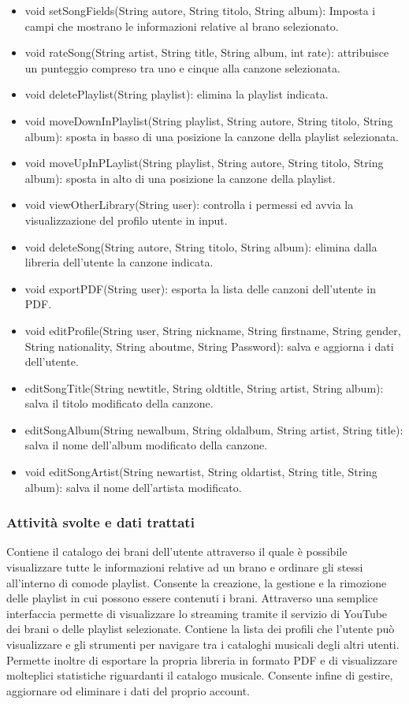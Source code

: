 \begin{itemize}
    \item void setSongFields(String autore, String titolo, String album):
    Imposta i campi che mostrano le informazioni relative al brano selezionato.
    \item void rateSong(String artist, String title, String album, int rate):
    attribuisce un punteggio compreso tra uno e cinque alla canzone selezionata.
    \item void deletePlaylist(String playlist): elimina la playlist
    indicata.
    \item void moveDownInPlaylist(String playlist, String autore, String
    titolo, String album): sposta in basso di una posizione la canzone della
    playlist selezionata.
    \item void moveUpInPLaylist(String playlist, String autore, String titolo,
    String album): sposta in alto di una posizione la canzone della playlist.
    \item
    void viewOtherLibrary(String user): controlla i permessi ed avvia la
    visualizzazione del profilo utente in input.
    \item void deleteSong(String autore, String titolo, String album): elimina
    dalla libreria dell'utente la canzone indicata.
    \item void exportPDF(String user): esporta la lista delle canzoni
    dell'utente in PDF.
    \item void editProfile(String user, String nickname, String firstname,
    String gender, String nationality, String aboutme, String Password):
    salva e aggiorna i dati dell'utente.
    \item editSongTitle(String newtitle, String oldtitle, String artist, String
    album): salva il titolo modificato della canzone.
    \item editSongAlbum(String newalbum, String oldalbum, String artist, String
    title): salva il nome dell'album modificato della canzone.
    \item void editSongArtist(String newartist, String oldartist, String title,
    String album): salva il nome dell'artista modificato.
\end{itemize}
 \subsubsection*{Attivit\`a svolte e dati trattati}
Contiene il catalogo dei brani dell'utente attraverso il quale \`e possibile
visualizzare tutte le informazioni relative ad un brano e ordinare gli stessi
all'interno di comode playlist. Consente la creazione, la gestione e la
rimozione delle playlist in cui possono essere contenuti i brani. Attraverso una semplice
interfaccia permette di visualizzare lo streaming tramite il servizio di YouTube
dei brani o delle playlist selezionate. Contiene la lista dei profili che
l'utente pu\`o visualizzare e gli strumenti per navigare tra i cataloghi
musicali degli altri utenti. Permette inoltre di esportare la propria libreria
in formato PDF e di visualizzare molteplici statistiche riguardanti il catalogo
musicale. Consente infine di gestire, aggiornare od eliminare i dati del proprio
account.
